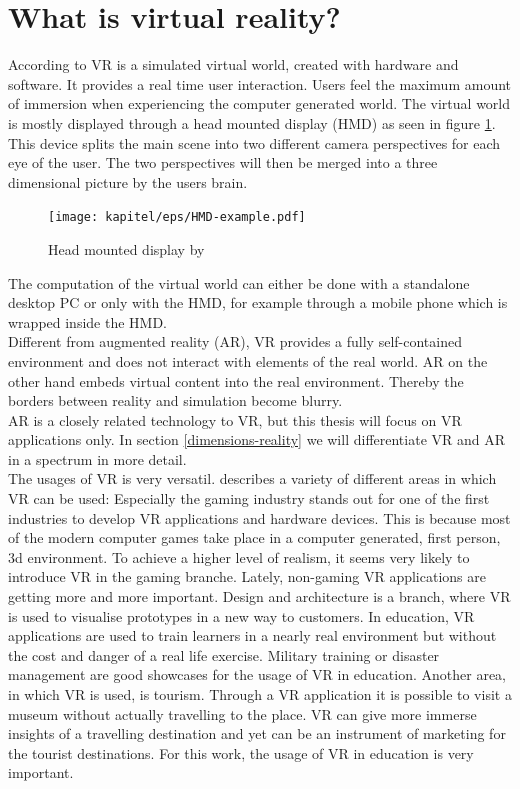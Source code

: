 \section{What is virtual reality?}
According to \cite{Fuchs.2011} VR is a simulated virtual world, created with hardware and software. It provides a real time user interaction. Users feel the maximum amount of immersion when experiencing the computer generated world. The virtual world is mostly displayed through a head mounted display (HMD) as seen in figure \ref{fig:hmd}. This device splits the main scene into two different camera perspectives for each eye of the user. The two perspectives will then be merged into a three dimensional picture by the users brain. \\
\begin{figure}[h!]
  \texttt{[image: kapitel/eps/HMD-example.pdf]}
  \centering
  \caption{Head mounted display by \cite{hmd1}}
  \label{fig:hmd}
\end{figure}
The computation of the virtual world can either be done with a standalone desktop PC or only with the HMD, for example through a mobile phone which is wrapped inside the HMD.\\
Different from augmented reality (AR), VR provides a fully self-contained environment and does not interact with elements of the real world. AR on the other hand embeds virtual content into the real environment. Thereby the borders between reality and simulation become blurry. \cite{Dorner.2013} \\AR is a closely related technology to VR, but this thesis will focus on VR applications only. In section \ref{dimensions-reality} we will differentiate VR and AR in a spectrum in more detail.\\
The usages of VR is very versatil. \cite{Linowes.2015} describes a variety of different areas in which VR can be used: Especially the gaming industry stands out for one of the first industries to develop VR applications and hardware devices. This is because most of the modern computer games take place in a computer generated, first person, 3d environment. To achieve a higher level of realism, it seems very likely to introduce VR in the gaming branche. Lately, non-gaming VR applications are getting more and more important. Design and architecture is a branch, where VR is used to visualise prototypes in a new way to customers. In education, VR applications are used to train learners in a nearly real environment but without the cost and danger of a real life exercise. Military training or disaster management are good showcases for the usage of VR in education. Another area, in which VR is used, is tourism. Through a VR application it is possible to visit a museum without actually travelling to the place. VR can give more immerse insights of a travelling destination and yet can be an instrument of marketing for the tourist destinations. For this work, the usage of VR in education  is very important.

